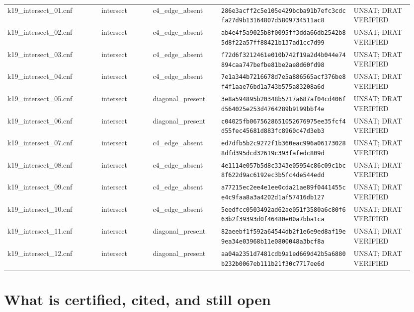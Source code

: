 \documentclass[11pt]{article}
\newcommand{\hash}[2]{\texttt{#1}\newline\texttt{#2}}
\begin{document}
\begin{longtable}{>{\ttfamily}p{0.22\linewidth}p{0.12\linewidth}p{0.16\linewidth}p{0.31\linewidth}p{0.14\linewidth}}
k19\_intersect\_01.cnf & intersect & c4\_edge\_absent & \hash{286e3acff2c5e105e429bcba91b7efc3}{cdcfa27d9b13164807d5809734511ac8} & UNSAT; DRAT VERIFIED \\
k19\_intersect\_02.cnf & intersect & c4\_edge\_absent & \hash{ab4e4f5a9025b8f0095ff3dda66db254}{2b85d8f22a57ff88421b137ad1cc7d99} & UNSAT; DRAT VERIFIED \\
k19\_intersect\_03.cnf & intersect & c4\_edge\_absent & \hash{f72d6f3212461e010b742f19a2d4b044}{e74894caa747befbe81be2ae8d60fd98} & UNSAT; DRAT VERIFIED \\
k19\_intersect\_04.cnf & intersect & c4\_edge\_absent & \hash{7e1a344b7216678d7e5a886565acf376}{be8f4f1aae76bd1a743b575a83208a6d} & UNSAT; DRAT VERIFIED \\
k19\_intersect\_05.cnf & intersect & diagonal\_present & \hash{3e8a594895b20348b5717a687af04cd4}{06fd564025e253d4764289b9199bbf4e} & UNSAT; DRAT VERIFIED \\
k19\_intersect\_06.cnf & intersect & diagonal\_present & \hash{c04025fb0675628651052676975ee35f}{cf4d55fec45681d883fc8960c47d3eb3} & UNSAT; DRAT VERIFIED \\
k19\_intersect\_07.cnf & intersect & c4\_edge\_absent & \hash{ed7dfb5b2c9272f1b360eac996a06173}{0288dfd395dcd32619c393fafedc809d} & UNSAT; DRAT VERIFIED \\
k19\_intersect\_08.cnf & intersect & c4\_edge\_absent & \hash{4e1114e057b5d8c3343e05954c86c09c}{1bc8f622d9ac6192ec3b5fc4de544edd} & UNSAT; DRAT VERIFIED \\
k19\_intersect\_09.cnf & intersect & c4\_edge\_absent & \hash{a77215ec2ee4e1ee0cda21ae89f04414}{55ce4c9faa8a3a4202d1af57416db127} & UNSAT; DRAT VERIFIED \\
k19\_intersect\_10.cnf & intersect & c4\_edge\_absent & \hash{5eedfcc0503492ad62ae051f3580a6c8}{0f663b2f39393d0f46480e00a7bba1ca} & UNSAT; DRAT VERIFIED \\
k19\_intersect\_11.cnf & intersect & diagonal\_present & \hash{82aeebf1f592a64544db2f1e6e9ed8af}{19e9ea34e03968b11e0800048a3bcf8a} & UNSAT; DRAT VERIFIED \\
k19\_intersect\_12.cnf & intersect & diagonal\_present & \hash{aa04a2351d7481cdb9a1ed669d42b5a6}{880b232b0067eb111b21f30c7717ee6d} & UNSAT; DRAT VERIFIED \\
\bottomrule
\end{longtable}
\normalsize

\section{What is certified, cited, and still open}
\end{document}
